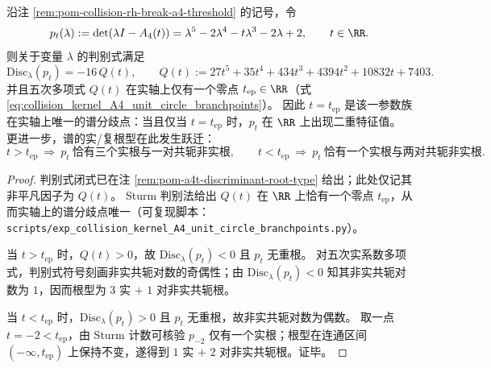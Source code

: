 %
%

\begin{proposition}\label{prop:pom-a4t-real-ep-branchpoint}
沿注 \ref{rem:pom-collision-rh-break-a4-threshold} 的记号，令
\[
p_t(\lambda):=\det(\lambda I-A_4(t))=\lambda^{5}-2\lambda^{4}-t\lambda^{3}-2\lambda+2,
\qquad t\in\RR.
\]
则关于变量 \(\lambda\) 的判别式满足
\[
\mathrm{Disc}_\lambda(p_t)=-16\,Q(t),
\qquad
Q(t):=27t^5+35t^4+434t^3+4394t^2+10832t+7403.
\]
并且五次多项式 \(Q(t)\) 在实轴上仅有一个零点 \(t_{\mathrm{ep}}\in\RR\)（式 \eqref{eq:collision_kernel_A4_unit_circle_branchpoints}）。
因此 \(t=t_{\mathrm{ep}}\) 是该一参数族在实轴上唯一的谱分歧点：当且仅当 \(t=t_{\mathrm{ep}}\) 时，\(p_t\) 在 \(\RR\) 上出现二重特征值。
更进一步，谱的实/复根型在此发生跃迁：
\[
t>t_{\mathrm{ep}}
\ \Longrightarrow\
p_t\ \text{恰有三个实根与一对共轭非实根},
\qquad
t<t_{\mathrm{ep}}
\ \Longrightarrow\
p_t\ \text{恰有一个实根与两对共轭非实根}.
\]
\end{proposition}
\begin{proof}
判别式闭式已在注 \ref{rem:pom-a4t-discriminant-root-type} 给出；此处仅记其非平凡因子为 \(Q(t)\)。
Sturm 判别法给出 \(Q(t)\) 在 \(\RR\) 上恰有一个零点 \(t_{\mathrm{ep}}\)，从而实轴上的谱分歧点唯一（可复现脚本：\texttt{scripts/exp\_collision\_kernel\_A4\_unit\_circle\_branchpoints.py}）。
\par
当 \(t>t_{\mathrm{ep}}\) 时，\(Q(t)>0\)，故 \(\mathrm{Disc}_\lambda(p_t)<0\) 且 \(p_t\) 无重根。
对五次实系数多项式，判别式符号刻画非实共轭对数的奇偶性；由 \(\mathrm{Disc}_\lambda(p_t)<0\) 知其非实共轭对数为 \(1\)，因而根型为 \(3\) 实 \(+\) \(1\) 对非实共轭根。
\par
当 \(t<t_{\mathrm{ep}}\) 时，\(\mathrm{Disc}_\lambda(p_t)>0\) 且 \(p_t\) 无重根，故非实共轭对数为偶数。
取一点 \(t=-2<t_{\mathrm{ep}}\)，由 Sturm 计数可核验 \(p_{-2}\) 仅有一个实根；根型在连通区间 \((-\infty,t_{\mathrm{ep}})\) 上保持不变，遂得到 \(1\) 实 \(+\) \(2\) 对非实共轭根。证毕。
\end{proof}



